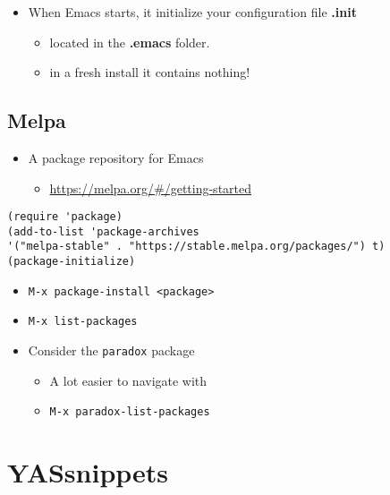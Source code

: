 \documentclass[11pt]{article}
\begin{document}
\begin{itemize}
\item When Emacs starts, it initialize your configuration file \textbf{.init}

\begin{itemize}
\item located in the \textbf{.emacs} folder.

\item in a fresh install it contains nothing!
\end{itemize}
\end{itemize}

\subsection{Melpa}
\label{sec:org3f9a840}

\begin{itemize}
\item A package repository for Emacs

\begin{itemize}
\item \url{https://melpa.org/\#/getting-started}
\end{itemize}
\end{itemize}

\begin{verbatim}
(require 'package)
(add-to-list 'package-archives
'("melpa-stable" . "https://stable.melpa.org/packages/") t)
(package-initialize)
\end{verbatim}

\begin{itemize}
\item \texttt{M-x package-install <package>}

\item \texttt{M-x list-packages}

\item Consider the \texttt{paradox} package

\begin{itemize}
\item A lot easier to navigate with

\item \texttt{M-x paradox-list-packages}
\end{itemize}
\end{itemize}

\section{YASsnippets}
\label{sec:orgb129547}
\end{document}
